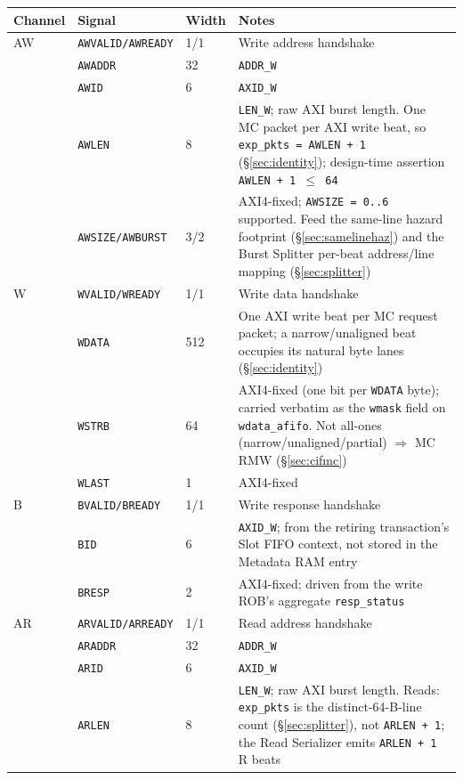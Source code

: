 \begin{longtable}{p{1.3cm}p{3.2cm}p{1.6cm}p{9.5cm}}
\toprule
\textbf{Channel} & \textbf{Signal} & \textbf{Width} & \textbf{Notes}\\
\midrule
AW & \texttt{AWVALID/AWREADY} & 1/1 & Write address handshake\\
   & \texttt{AWADDR}          & 32  & \texttt{ADDR\_W}\\
   & \texttt{AWID}            & 6   & \texttt{AXID\_W}\\
   & \texttt{AWLEN}           & 8   & \texttt{LEN\_W}; raw AXI burst length. One MC packet per AXI write beat, so \texttt{exp\_pkts = AWLEN + 1} (\S\ref{sec:identity}); design-time assertion \texttt{AWLEN + 1 $\le$ 64}\\
   & \texttt{AWSIZE/AWBURST}  & 3/2 & AXI4-fixed; \texttt{AWSIZE = 0..6} supported. Feed the same-line hazard footprint (\S\ref{sec:samelinehaz}) and the Burst Splitter per-beat address/line mapping (\S\ref{sec:splitter})\\
\midrule
W  & \texttt{WVALID/WREADY}   & 1/1 & Write data handshake\\
   & \texttt{WDATA}           & 512 & One AXI write beat per MC request packet; a narrow/unaligned beat occupies its natural byte lanes (\S\ref{sec:identity})\\
   & \texttt{WSTRB}           & 64  & AXI4-fixed (one bit per \texttt{WDATA} byte); carried verbatim as the \texttt{wmask} field on \texttt{wdata\_afifo}. Not all-ones (narrow/unaligned/partial) $\Rightarrow$ MC RMW (\S\ref{sec:cifmc})\\
   & \texttt{WLAST}           & 1   & AXI4-fixed\\
\midrule
B  & \texttt{BVALID/BREADY}   & 1/1 & Write response handshake\\
   & \texttt{BID}             & 6   & \texttt{AXID\_W}; from the retiring transaction's Slot FIFO context, not stored in the Metadata RAM entry\\
   & \texttt{BRESP}           & 2   & AXI4-fixed; driven from the write ROB's aggregate \texttt{resp\_status}\\
\midrule
AR & \texttt{ARVALID/ARREADY} & 1/1 & Read address handshake\\
   & \texttt{ARADDR}          & 32  & \texttt{ADDR\_W}\\
   & \texttt{ARID}            & 6   & \texttt{AXID\_W}\\
   & \texttt{ARLEN}           & 8   & \texttt{LEN\_W}; raw AXI burst length. Reads: \texttt{exp\_pkts} is the distinct-64-B-line count (\S\ref{sec:splitter}), not \texttt{ARLEN + 1}; the Read Serializer emits \texttt{ARLEN + 1} R beats\\

\end{longtable}

